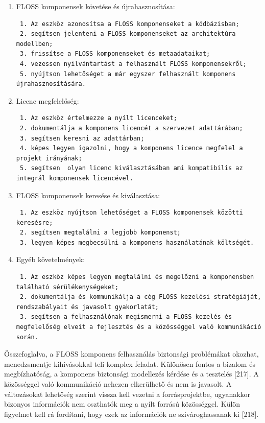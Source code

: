 \documentclass[12pt,magyar,a4paper,oneside]{scrreprt}
\begin{document}
\begin{enumerate}
\def\labelenumi{\arabic{enumi}.}
\item
  FLOSS komponensek követése és újrahasznosítása:

\begin{verbatim}
 1. Az eszköz azonosítsa a FLOSS komponenseket a kódbázisban;
 2. segítsen jelenteni a FLOSS komponenseket az architektúra modellben;
 3. frissítse a FLOSS komponenseket és metaadataikat;
 4. vezessen nyilvántartást a felhasznált FLOSS komponensekről;
 5. nyújtson lehetőséget a már egyszer felhasznált komponens újrahasznosítására.
\end{verbatim}
\item
  Licenc megfelelőség:

\begin{verbatim}
 1. Az eszköz értelmezze a nyílt licenceket;
 2. dokumentálja a komponens licencét a szervezet adattárában;
 3. segítsen keresni az adattárban;
 4. képes legyen igazolni, hogy a komponens licence megfelel a projekt irányának;
 5. segítsen  olyan licenc kiválasztásában ami kompatibilis az integrál komponensek licencével.
\end{verbatim}
\item
  FLOSS komponensek keresése és kiválasztása:

\begin{verbatim}
 1. Az eszköz nyújtson lehetőséget a FLOSS komponensek közötti keresésre;
 2. segítsen megtalálni a legjobb komponenst;
 3. legyen képes megbecsülni a komponens használatának költségét. 
\end{verbatim}
\item
  Egyéb követelmények:

\begin{verbatim}
 1. Az eszköz képes legyen megtalálni és megelőzni a komponensben található sérülékenységeket;
 2. dokumentálja és kommunikálja a cég FLOSS kezelési stratégiáját, rendszabályait és javasolt gyakorlatát;
 3. segítsen a felhasználónak megismerni a FLOSS kezelés és megfelelőség elveit a fejlesztés és a közösséggel való kommunikáció során.
\end{verbatim}
\end{enumerate}

Összefoglalva, a FLOSS komponens felhasználás biztonsági problémákat
okozhat, menedzsmentje kihívásokkal teli komplex feladat. Különösen
fontos a bizalom és megbízhatóság, a komponens biztonsági modellezés
kérdése és a tesztelés {[}217{]}. A közösséggel való kommunikáció
nehezen elkerülhető és nem is javasolt. A változásokat lehetőség szerint
vissza kell vezetni a forrásprojektbe, ugyanakkor bizonyos információk
nem oszthatók meg a nyílt forrású közösséggel. Külön figyelmet kell rá
fordítani, hogy ezek az információk ne szivároghassanak ki {[}218{]}.
\end{document}
